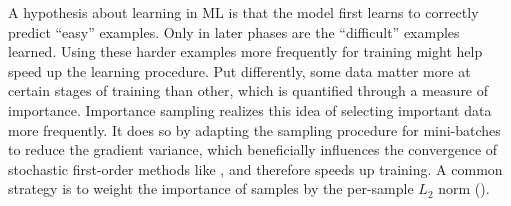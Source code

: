 A hypothesis about learning in ML is that the model first learns to correctly
predict ``easy'' examples. Only in later phases are the ``difficult'' examples
learned. Using these harder examples more frequently for training might help
speed up the learning procedure. Put differently, some data matter more at
certain stages of training than other, which is quantified through a measure of
importance. Importance sampling realizes this idea of selecting important data
more frequently. It does so by adapting the sampling procedure for mini-batches
to reduce the gradient variance, which beneficially influences the convergence
of stochastic first-order methods like \sgd, and therefore speeds up training. A
common strategy is to weight the importance of samples by the per-sample $L_2$
norm
().

